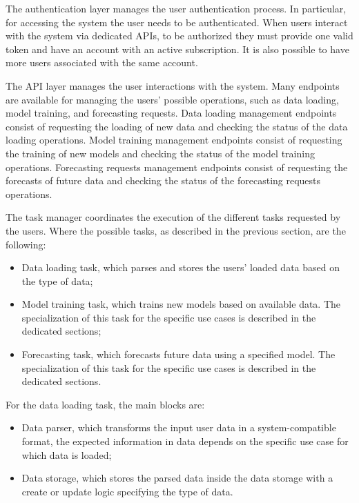 The authentication layer manages the user authentication process.
In particular, for accessing the system the user needs to be authenticated.
When users interact with the system via dedicated APIs, to be authorized they must provide one valid token and have an account with an active subscription.
It is also possible to have more users associated with the same account.

The API layer manages the user interactions with the system.
Many endpoints are available for managing the users' possible operations, such as data loading, model training, and forecasting requests.
Data loading management endpoints consist of requesting the loading of new data and checking the status of the data loading operations.
Model training management endpoints consist of requesting the training of new models and checking the status of the model training operations.
Forecasting requests management endpoints consist of requesting the forecasts of future data and checking the status of the forecasting requests operations.

The task manager coordinates the execution of the different tasks requested by the users.
Where the possible tasks, as described in the previous section, are the following:
\begin{itemize}
  \item Data loading task, which parses and stores the users' loaded data based on the type of data;
  \item Model training task, which trains new models based on available data. The specialization of this task for the specific use cases is described in the dedicated sections;
  \item Forecasting task, which forecasts future data using a specified model. The specialization of this task for the specific use cases is described in the dedicated sections.
\end{itemize}

For the data loading task, the main blocks are:
\begin{itemize}
  \item Data parser, which transforms the input user data in a system-compatible format, the expected information in data depends on the specific use case for which data is loaded;
  \item Data storage, which stores the parsed data inside the data storage with a create or update logic specifying the type of data.
\end{itemize}


